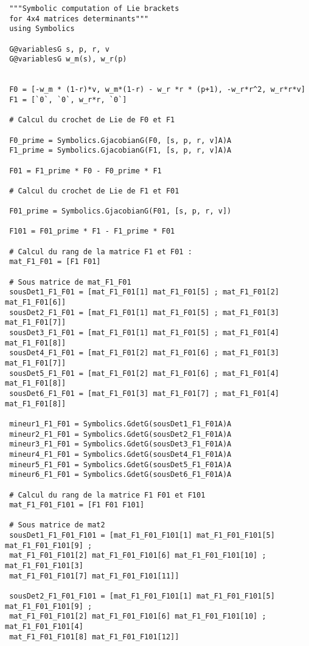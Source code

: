 \begin{lstlisting}
 """Symbolic computation of Lie brackets
 for 4x4 matrices determinants"""
 using Symbolics

 G@variablesG s, p, r, v
 G@variablesG w_m(s), w_r(p)
 

 F0 = [-w_m * (1-r)*v, w_m*(1-r) - w_r *r * (p+1), -w_r*r^2, w_r*r*v]
 F1 = [`0`, `0`, w_r*r, `0`]
 
 # Calcul du crochet de Lie de F0 et F1

 F0_prime = Symbolics.GjacobianG(F0, [s, p, r, v]A)A
 F1_prime = Symbolics.GjacobianG(F1, [s, p, r, v]A)A

 F01 = F1_prime * F0 - F0_prime * F1

 # Calcul du crochet de Lie de F1 et F01

 F01_prime = Symbolics.GjacobianG(F01, [s, p, r, v])

 F101 = F01_prime * F1 - F1_prime * F01
 
 # Calcul du rang de la matrice F1 et F01 :
 mat_F1_F01 = [F1 F01]
 
 # Sous matrice de mat_F1_F01
 sousDet1_F1_F01 = [mat_F1_F01[1] mat_F1_F01[5] ; mat_F1_F01[2] mat_F1_F01[6]]
 sousDet2_F1_F01 = [mat_F1_F01[1] mat_F1_F01[5] ; mat_F1_F01[3] mat_F1_F01[7]]
 sousDet3_F1_F01 = [mat_F1_F01[1] mat_F1_F01[5] ; mat_F1_F01[4] mat_F1_F01[8]]
 sousDet4_F1_F01 = [mat_F1_F01[2] mat_F1_F01[6] ; mat_F1_F01[3] mat_F1_F01[7]]
 sousDet5_F1_F01 = [mat_F1_F01[2] mat_F1_F01[6] ; mat_F1_F01[4] mat_F1_F01[8]]
 sousDet6_F1_F01 = [mat_F1_F01[3] mat_F1_F01[7] ; mat_F1_F01[4] mat_F1_F01[8]]
 
 mineur1_F1_F01 = Symbolics.GdetG(sousDet1_F1_F01A)A
 mineur2_F1_F01 = Symbolics.GdetG(sousDet2_F1_F01A)A
 mineur3_F1_F01 = Symbolics.GdetG(sousDet3_F1_F01A)A
 mineur4_F1_F01 = Symbolics.GdetG(sousDet4_F1_F01A)A
 mineur5_F1_F01 = Symbolics.GdetG(sousDet5_F1_F01A)A
 mineur6_F1_F01 = Symbolics.GdetG(sousDet6_F1_F01A)A
 
 # Calcul du rang de la matrice F1 F01 et F101
 mat_F1_F01_F101 = [F1 F01 F101]
 
 # Sous matrice de mat2
 sousDet1_F1_F01_F101 = [mat_F1_F01_F101[1] mat_F1_F01_F101[5] mat_F1_F01_F101[9] ;
 mat_F1_F01_F101[2] mat_F1_F01_F101[6] mat_F1_F01_F101[10] ; mat_F1_F01_F101[3]
 mat_F1_F01_F101[7] mat_F1_F01_F101[11]]

 sousDet2_F1_F01_F101 = [mat_F1_F01_F101[1] mat_F1_F01_F101[5] mat_F1_F01_F101[9] ;
 mat_F1_F01_F101[2] mat_F1_F01_F101[6] mat_F1_F01_F101[10] ; mat_F1_F01_F101[4]
 mat_F1_F01_F101[8] mat_F1_F01_F101[12]]
 

\end{lstlisting}
